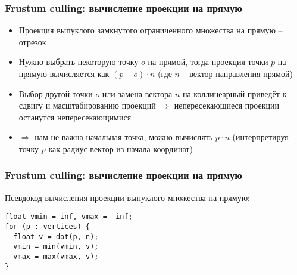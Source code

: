 \documentclass{beamer}
\begin{document}
\begin{frame}[fragile]
\frametitle{Frustum culling: вычисление проекции на прямую}
\begin{itemize}
\item Проекция выпуклого замкнутого ограниченного множества на прямую -- отрезок
\pause
\item Нужно выбрать некоторую точку \begin{math}o\end{math} на прямой, тогда проекция точки \begin{math}p\end{math} на прямую вычисляется как \begin{math}(p - o) \cdot n\end{math} (где \begin{math}n\end{math} -- вектор направления прямой)
\pause
\item Выбор другой точки \begin{math}o\end{math} или замена вектора \begin{math}n\end{math} на коллинеарный приведёт к сдвигу и масштабированию проекций \begin{math}\Longrightarrow\end{math} непересекающиеся проекции останутся непересекающимися
\pause
\item \begin{math}\Rightarrow\end{math} нам не важна начальная точка, можно вычислять \begin{math}p \cdot n\end{math} (интерпретируя точку \begin{math}p\end{math} как радиус-вектор из начала координат)
\end{itemize}
\end{frame}

\begin{frame}[fragile]
\frametitle{Frustum culling: вычисление проекции на прямую}
Псевдокод вычисления проекции выпуклого множества на прямую:
\begin{verbatim}
float vmin = inf, vmax = -inf;
for (p : vertices) {
  float v = dot(p, n);
  vmin = min(vmin, v);
  vmax = max(vmax, v);
}
\end{verbatim}
\end{frame}
\end{document}
